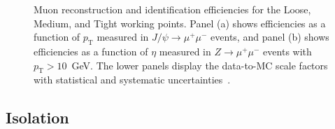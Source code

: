\begin{figure}[h]
  \centering
  \hfill
  \caption{Muon reconstruction and identification efficiencies for the Loose, Medium, and Tight working points. Panel (a) shows efficiencies as a function of $p_{\text{T}}$ measured in $J/\psi \to \mu^+\mu^-$ events, and panel (b) shows efficiencies as a function of $\eta$ measured in $Z \to \mu^+\mu^-$ events with $p_{\text{T}}>10$~GeV. The lower panels display the data-to-MC scale factors with statistical and systematic uncertainties~\cite{muon_reco_run2}.}
  \label{fig:muon_eff}
\end{figure}

\subsection*{Isolation} 

